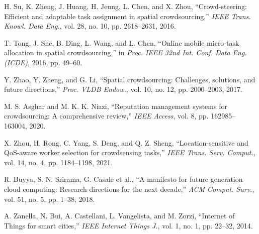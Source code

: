 \documentclass[10pt,twocolumn,a4paper]{article}
\begin{document}
\noindent
[19] H. Su, K. Zheng, J. Huang, H. Jeung, L. Chen, and X. Zhou, ``Crowd-steering: Efficient and adaptable task assignment in spatial crowdsourcing,'' \textit{IEEE Trans. Knowl. Data Eng.}, vol. 28, no. 10, pp. 2618--2631, 2016.

\noindent
[20] T. Tong, J. She, B. Ding, L. Wang, and L. Chen, ``Online mobile micro-task allocation in spatial crowdsourcing,'' in \textit{Proc. IEEE 32nd Int. Conf. Data Eng. (ICDE)}, 2016, pp. 49--60.

\noindent
[21] Y. Zhao, Y. Zheng, and G. Li, ``Spatial crowdsourcing: Challenges, solutions, and future directions,'' \textit{Proc. VLDB Endow.}, vol. 10, no. 12, pp. 2000--2003, 2017.

\noindent
[22] M. S. Asghar and M. K. K. Niazi, ``Reputation management systems for crowdsourcing: A comprehensive review,'' \textit{IEEE Access}, vol. 8, pp. 162985--163004, 2020.

\noindent
[23] X. Zhou, H. Rong, C. Yang, S. Deng, and Q. Z. Sheng, ``Location-sensitive and QoS-aware worker selection for crowdsensing tasks,'' \textit{IEEE Trans. Serv. Comput.}, vol. 14, no. 4, pp. 1184--1198, 2021.

\noindent
[24] R. Buyya, S. N. Srirama, G. Casale et al., ``A manifesto for future generation cloud computing: Research directions for the next decade,'' \textit{ACM Comput. Surv.}, vol. 51, no. 5, pp. 1--38, 2018.

\noindent
[25] A. Zanella, N. Bui, A. Castellani, L. Vangelista, and M. Zorzi, ``Internet of Things for smart cities,'' \textit{IEEE Internet Things J.}, vol. 1, no. 1, pp. 22--32, 2014.
\end{document}
